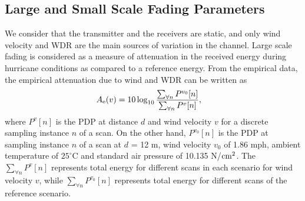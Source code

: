 \documentclass[conference]{IEEEtran}
\begin{document}


\subsection{Large and Small Scale Fading Parameters}
We consider that the transmitter and the receivers are static, and only wind velocity and WDR are the main sources of variation in the channel. Large scale fading is considered as a measure of attenuation in the received energy during hurricane conditions as compared to a reference energy. From the empirical data, the empirical attenuation due to wind and WDR can be written as    
\begin{align}
A_{\rm e}(v) &= 10\log_{10} \frac{\sum_{\forall n}P^{v_{0}}[n]}{\sum_{\forall n}P^{v}[n]},  \label{Eq:Largescale_1} 
\end{align}
where $P^{v}[n]$ is the PDP at distance $d$ and wind velocity $v$ for a discrete sampling instance $n$ of a scan. On the other hand, $P^{v_0}[n]$ is the PDP at sampling instance $n$ of a scan at $d$ = 12 m, wind velocity $v_0$ of 1.86 mph, ambient temperature of  $25 ^{\circ}$C and standard air pressure of 10.135 N/${\rm cm}^2$. The $ \sum_{\forall n}P^{v}[n]$ represents total energy for different scans in each scenario for wind velocity $v$, while $\sum_{\forall n}P^{v_0}[n]$ represents total energy for different scans of the reference scenario. %
\end{document}
